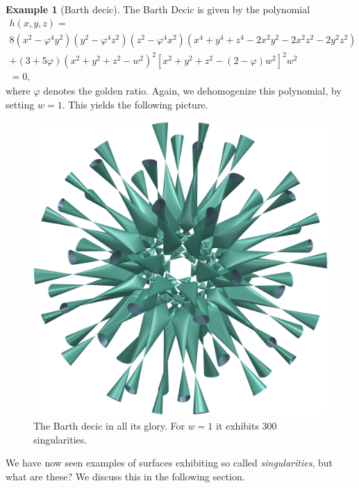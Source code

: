 \documentclass[a4paper]{article}
\theoremstyle{definition}
\newtheorem{exmpl}{Example}
\theoremstyle{plain}
\begin{document}
    \begin{exmpl}[Barth decic]
        The Barth Decic is given by the polynomial
        \begin{multline}
            h(x, y, z) = \\
            8(x^2 - \varphi^4y^2)(y^2 - \varphi^4z^2)(z^2 - \varphi^4 x^2)(x^4 + y^4 +
            z^4 - 2x^2y^2 - 2x^2z^2 - 2y^2z^2) \\ + (3 + 5\varphi)(x^2 + y^2 + z^2
            - w^2)^2 \left[ x^2 + y^2 + z^2 - (2 - \varphi)w^2 \right]^2 w^2 \\
            = 0, 
        \end{multline}
        where $\varphi$ denotes the golden ratio. Again, we dehomogenize this
        polynomial, by setting $w = 1$. This yields the following picture.
        \begin{figure}[]
            \centering
            \includegraphics[width=1.0\linewidth]{../pictures/barths_decic.png}
            \caption{The Barth decic in all its glory. For $w = 1$ it exhibits
            300 singularities.}
            \label{fig:}
        \end{figure}
    \end{exmpl}

    We have now seen examples of surfaces exhibiting so called
    \emph{singularities}, but what are these? We discuss this in the following
    section.
\end{document}
